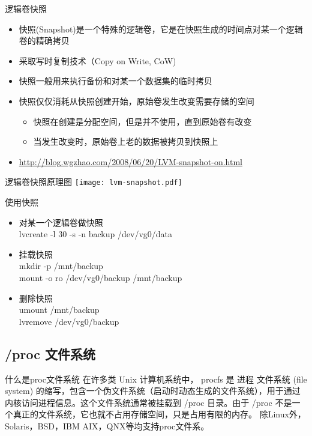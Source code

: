 \begin{frame}{逻辑卷快照}
\begin{itemize}
\item 快照(Snapshot)是一个特殊的逻辑卷，它是在快照生成的时间点对某一个逻辑卷的精确拷贝
\item 采取写时复制技术（Copy on Write, CoW)
\item 快照一般用来执行备份和对某一个数据集的临时拷贝
\item 快照仅仅消耗从快照创建开始，原始卷发生改变需要存储的空间

\begin{itemize}
\item 快照在创建是分配空间，但是并不使用，直到原始卷有改变
\item 当发生改变时，原始卷上老的数据被拷贝到快照上
\end{itemize}
\item \href{http://blog.wgzhao.com/2008/06/20/LVM-snapshot-on.html}{http://blog.wgzhao.com/2008/06/20/LVM-snapshot-on.html}
\end{itemize}
\end{frame}

\begin{frame}[plain]{逻辑卷快照原理图}
\texttt{[image: lvm-snapshot.pdf]}
\end{frame} 

\begin{frame}{使用快照}
\begin{itemize}
\item 对某一个逻辑卷做快照\\
lvcreate -l 30 -s -n backup /dev/vg0/data
\item 挂载快照\\
mkdir -p /mnt/backup\\
mount -o ro /dev/vg0/backup /mnt/backup
\item 删除快照\\
umount /mnt/backup \\
lvremove /dev/vg0/backup
\end{itemize}
\end{frame} 

\subsection{/proc 文件系统}

\begin{frame}{什么是proc文件系统}
在许多类 Unix 计算机系统中， procfs 是 进程 文件系统 (file system) 的缩写，包含一个伪文件系统（启动时动态生成的文件系统），用于通过内核访问进程信息。这个文件系统通常被挂载到 /proc 目录。由于 /proc 不是一个真正的文件系统，它也就不占用存储空间，只是占用有限的内存。
除Linux外，Solaris，BSD，IBM AIX，QNX等均支持proc文件系。
\end{frame}

